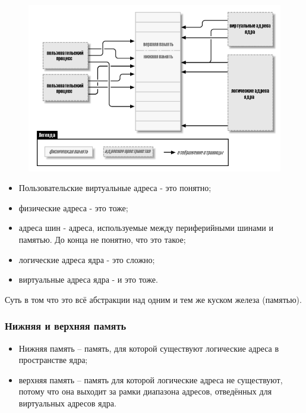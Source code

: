 \documentclass[12pt]{report}
\begin{document}
\begin{figure}[H]
	\begin{center}
		\includegraphics[scale=0.5]{img/memory.png}
	\end{center}
	\label{fig:memory}
\end{figure}

\begin{itemize}
	\item Пользовательские виртуальные адреса - это понятно;
	\item физические адреса - это тоже;
	\item адреса шин - адреса, используемые между периферийными шинами и памятью. До конца не понятно, что это такое;
	\item логические адреса ядра - это сложно;
	\item виртуальные адреса ядра - и это тоже.
\end{itemize}

Суть в том что это всё абстракции над одним и тем же куском железа (памятью).

\subsubsection{Нижняя и верхняя память}

\begin{itemize}
	\item Нижняя память -- память, для которой существуют логические адреса в пространстве ядра;
	\item верхняя память -- память для которой логические адреса не существуют, потому что она выходит за рамки диапазона адресов, отведённых для виртуальных адресов ядра.
\end{itemize}
\end{document}

